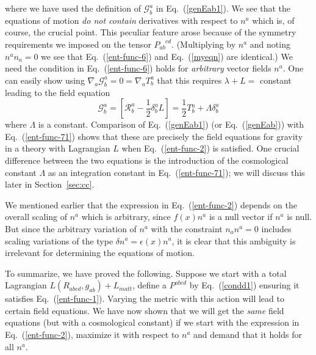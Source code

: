 \documentclass[12pt]{iopart}
\def\eq#1{{Eq.~(\ref{#1})}}
\newcommand{\ph}[1]{\phantom{#1}}
\begin{document}
where we have used the definition of $\mathcal{G}^a_b$ in \eq{genEab1}.
We see that the equations of motion \emph{do not contain}
derivatives with respect to $n^a$ which is, of course, the crucial point. This peculiar feature arose because
of the symmetry requirements we imposed on the tensor
$P_{ab}^{\ph{a}\ph{b}cd}$. 
(Multiplying by $n^a$ and noting $n^an_a=0$ we see that \eq{ent-func-6} and \eq{myeqn} are identical.)
We  need the condition in
\eq{ent-func-6} holds for \emph{arbitrary}  vector fields
$ n^a$.
One can easily show \cite{aseementropy} using $\nabla_a \mathcal{G}^a_b =0=\nabla_aT^a_b$ that this requires $\lambda +L = $ constant leading to the field equation
\begin{equation}
\mathcal{G}^a_b = \left[ \mathcal{R}^a_b-\frac{1}{2}\delta^a_b L \right]=
  \frac{1}{2}T{}_b^a +\Lambda\delta^a_b   
\label{ent-func-71}
\end{equation}
where $\Lambda$ is a constant.
Comparison of \eq{genEab1} (or \eq{genEab}) with \eq{ent-func-71} shows that these are  precisely the field equations for  gravity  in a theory with Lagrangian $L$ when \eq{ent-func-2} is satisfied.
One crucial difference between the two equations is the introduction of the cosmological constant $\Lambda$ as an integration constant in \eq{ent-func-71}; we will discuss this  later in Section~\ref{sec:cc}.

We mentioned earlier that the expression in \eq{ent-func-2} depends on the overall scaling of $n^a$ which is arbitrary, since $f(x)n^a$ is a null vector if $n^a$ is null. But since the arbitrary variation of $n^a$ with the constraint $n_an^a=0$ includes scaling variations of the type $\delta n^a=\epsilon(x) n^a$, it is clear that this ambiguity is irrelevant for determining the equations of motion. 


To summarize, we have proved the following. 
 Suppose we start with a total Lagrangian $L(R_{abcd},g_{ab})+L_{matt}$, define a $P^{abcd}$ by \eq{condd1} ensuring it satisfies
\eq{ent-func-1}. 
Varying the metric with this action will lead to certain field equations. We have now shown that we will get the \textit{same} field equations (but with a cosmological constant) if we start with the expression in \eq{ent-func-2}, maximize it with respect to $n^a$ and demand that it holds for all $n^a$. 
\end{document}
